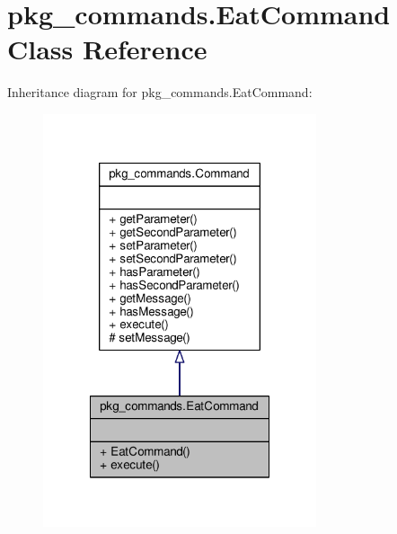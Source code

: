 \hypertarget{classpkg__commands_1_1EatCommand}{\section{pkg\-\_\-commands.\-Eat\-Command Class Reference}
\label{classpkg__commands_1_1EatCommand}
}


Inheritance diagram for pkg\-\_\-commands.\-Eat\-Command\-:
\nopagebreak
\begin{figure}[H]
\begin{center}
\leavevmode
\includegraphics[width=228pt]{classpkg__commands_1_1EatCommand__inherit__graph}
\end{center}
\end{figure}


